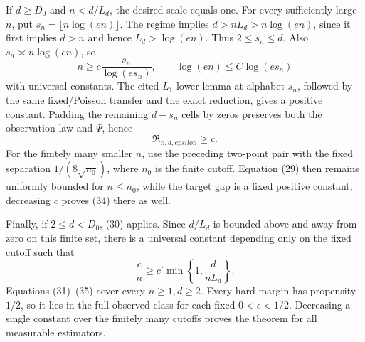 If \(d\geq D_0\) and \(n<d/L_d\), the desired scale equals one.  For every sufficiently large \(n\), put \(s_n=\lfloor n\log(en)\rfloor\).  The regime implies \(d>nL_d>n\log(en)\), since it first implies \(d>n\) and hence \(L_d>\log(en)\).  Thus \(2\leq s_n\leq d\).  Also \(s_n\asymp n\log(en)\), so
\[
 n\geq c\frac{s_n}{\log(es_n)},\qquad \log(en)\leq C\log(es_n)   \tag{33}
\]
with universal constants.  The cited \(L_1\) lower lemma at alphabet \(s_n\), followed by the same fixed/Poisson transfer and the exact reduction, gives a positive constant.  Padding the remaining \(d-s_n\) cells by zeros preserves both the observation law and \(\Psi\), hence
\[
 \mathfrak R_{n,d,epsilon}\geq c.                                 \tag{34}
\]
For the finitely many smaller \(n\), use the preceding two-point pair with the fixed separation \(1/(8\sqrt{n_0})\), where \(n_0\) is the finite cutoff.  Equation (29) then remains uniformly bounded for \(n\leq n_0\), while the target gap is a fixed positive constant; decreasing \(c\) proves (34) there as well.

Finally, if \(2\leq d<D_0\), (30) applies.  Since \(d/L_d\) is bounded above and away from zero on this finite set, there is a universal constant depending only on the fixed cutoff such that
\[
 \frac cn\geq c'\min\left\{1,\frac d{nL_d}\right\}.              \tag{35}
\]
Equations (31)--(35) cover every \(n\geq1,d\geq2\).  Every hard margin has propensity \(1/2\), so it lies in the full observed class for each fixed \(0<\epsilon<1/2\).  Decreasing a single constant over the finitely many cutoffs proves the theorem for all measurable estimators.
